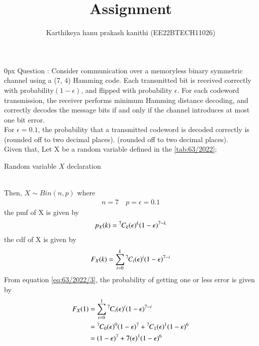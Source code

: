 \documentclass[article]{IEEEtran}
\theoremstyle{remark}
\begin{document}
\let\vec\mathbf


\title{
Assignment
}
\author{ Karthikeya hanu prakash kanithi (EE22BTECH11026)}
\maketitle
\parindent0px
\vspace{3cm}
Question : Consider communication over a memoryless binary symmetric channel using a
(7, 4) Hamming code. Each transmitted bit is received correctly with probability$(1 - \epsilon)$, and flipped with probability $\epsilon$. For each codeword transmission, the receiver
performs minimum Hamming distance decoding, and correctly decodes the message
bits if and only if the channel introduces at most one bit error.
\\For $\epsilon = 0.1$, the probability that a transmitted codeword is decoded correctly is
 \textunderscore\textunderscore\textunderscore\textunderscore\textunderscore\textunderscore (rounded off to two decimal places).
 (rounded off to two decimal places). 
\\ \solution 
Given that,
Let X be a random variable defined in the \autoref{tab:63/2022};
\begin{table}[h]
	\centering
	
	\caption{Random variable $X$ declaration}
        \label{tab:63/2022}
\end{table}
\\Then, $X \sim Bin(n,p)$ where 
\begin{align}
	n = 7 \quad p = \epsilon = 0.1 
	\label{eq:63/2022}
\end{align}
the pmf of X is given by
\begin{align}
    p_X(k) = {{}^{7}\mkern-1muC_{k}} (\epsilon)^k (1 - \epsilon)^{7-k}
    \label{eq:63/2022/2}
\end{align}
the cdf of X is given by
\begin{align}
    F_X(k) = \sum_{i=0}^{k} {{}^{7}\mkern-1muC_{i}} (\epsilon)^i (1 - \epsilon)^{7-i}
    \label{eq:63/2022/3}
\end{align}
From equation \eqref{eq:63/2022/3}, the probability of getting one or less error is given by 
\begin{align}
    F_X(1) &= \sum_{i=0}^{1} {{}^{7}\mkern-1muC_{i}} (\epsilon)^i (1-\epsilon)^{7-i}\\
    &= {{}^{7}\mkern-1muC_{0}} (\epsilon)^0 (1-\epsilon)^{7} + {{}^{7}\mkern-1muC_{1}} (\epsilon)^1 (1-\epsilon)^{6}\\
    &= (1-\epsilon)^{7}+7(\epsilon)^1(1-\epsilon)^{6} \label{eq:63/2022/4}
\end{align}
\end{document}
